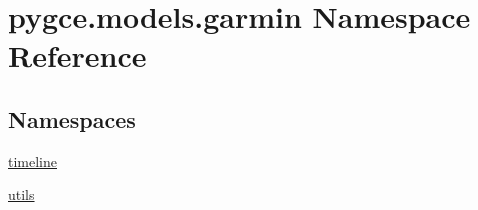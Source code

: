 \hypertarget{namespacepygce_1_1models_1_1garmin}{}\section{pygce.\+models.\+garmin Namespace Reference}
\label{namespacepygce_1_1models_1_1garmin}
\subsection*{Namespaces}
\begin{DoxyCompactItemize}
\item 
 \hyperlink{namespacepygce_1_1models_1_1garmin_1_1timeline}{timeline}
\item 
 \hyperlink{namespacepygce_1_1models_1_1garmin_1_1utils}{utils}
\end{DoxyCompactItemize}
